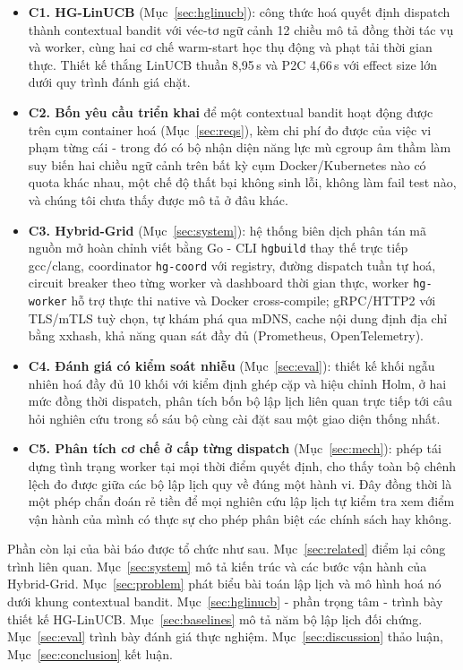 \documentclass[final,5p,times,twocolumn]{elsarticle}
\begin{document}
\begin{itemize}
\item \textbf{C1. HG-LinUCB} (Mục~\ref{sec:hglinucb}): công thức hoá quyết định dispatch thành contextual bandit với véc-tơ ngữ cảnh 12 chiều mô tả đồng thời tác vụ và worker, cùng hai cơ chế warm-start học thụ động và phạt tải thời gian thực. Thiết kế thắng LinUCB thuần 8,95\,s và P2C 4,66\,s với effect size lớn dưới quy trình đánh giá chặt.
\item \textbf{C2. Bốn yêu cầu triển khai} để một contextual bandit hoạt động được trên cụm container hoá (Mục~\ref{sec:reqs}), kèm chi phí đo được của việc vi phạm từng cái - trong đó có bộ nhận diện năng lực mù cgroup âm thầm làm suy biến hai chiều ngữ cảnh trên bất kỳ cụm Docker/Kubernetes nào có quota khác nhau, một chế độ thất bại không sinh lỗi, không làm fail test nào, và chúng tôi chưa thấy được mô tả ở đâu khác.
\item \textbf{C3. Hybrid-Grid} (Mục~\ref{sec:system}): hệ thống biên dịch phân tán mã nguồn mở hoàn chỉnh viết bằng Go - CLI \texttt{hgbuild} thay thế trực tiếp gcc/clang, coordinator \texttt{hg-coord} với registry, đường dispatch tuần tự hoá, circuit breaker theo từng worker và dashboard thời gian thực, worker \texttt{hg-worker} hỗ trợ thực thi native và Docker cross-compile; gRPC/HTTP2 với TLS/mTLS tuỳ chọn, tự khám phá qua mDNS, cache nội dung định địa chỉ bằng xxhash, khả năng quan sát đầy đủ (Prometheus, OpenTelemetry).
\item \textbf{C4. Đánh giá có kiểm soát nhiễu} (Mục~\ref{sec:eval}): thiết kế khối ngẫu nhiên hoá đầy đủ 10 khối với kiểm định ghép cặp và hiệu chỉnh Holm, ở hai mức đồng thời dispatch, phân tích bốn bộ lập lịch liên quan trực tiếp tới câu hỏi nghiên cứu trong số sáu bộ cùng cài đặt sau một giao diện thống nhất.
\item \textbf{C5. Phân tích cơ chế ở cấp từng dispatch} (Mục~\ref{sec:mech}): phép tái dựng tình trạng worker tại mọi thời điểm quyết định, cho thấy toàn bộ chênh lệch đo được giữa các bộ lập lịch quy về đúng một hành vi. Đây đồng thời là một phép chẩn đoán rẻ tiền để mọi nghiên cứu lập lịch tự kiểm tra xem điểm vận hành của mình có thực sự cho phép phân biệt các chính sách hay không.
\end{itemize}

Phần còn lại của bài báo được tổ chức như sau. Mục~\ref{sec:related} điểm lại công trình liên quan. Mục~\ref{sec:system} mô tả kiến trúc và các bước vận hành của Hybrid-Grid. Mục~\ref{sec:problem} phát biểu bài toán lập lịch và mô hình hoá nó dưới khung contextual bandit. Mục~\ref{sec:hglinucb} - phần trọng tâm - trình bày thiết kế HG-LinUCB. Mục~\ref{sec:baselines} mô tả năm bộ lập lịch đối chứng. Mục~\ref{sec:eval} trình bày đánh giá thực nghiệm. Mục~\ref{sec:discussion} thảo luận, Mục~\ref{sec:conclusion} kết luận.
\end{document}
